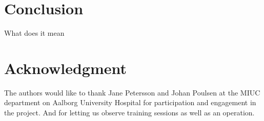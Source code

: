 \documentclass[conference]{IEEEtran}
\begin{document}
%
%

\section{Conclusion}
What does it mean



\section*{Acknowledgment}
The authors would like to thank Jane Petersson and Johan Poulsen at the MIUC department on Aalborg University Hospital for participation and engagement in the project. And for letting us observe training sessions as well as an operation.



%
%
%




\end{document}
